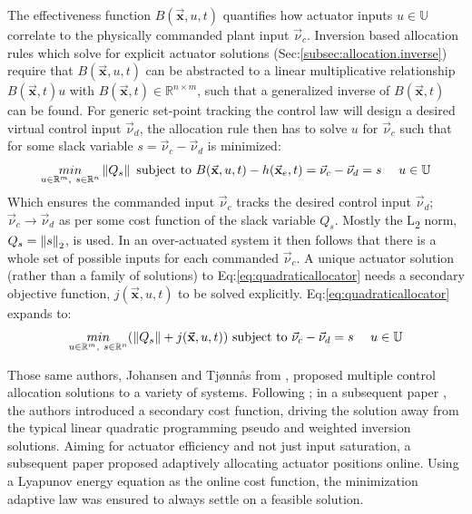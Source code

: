 \par
The effectiveness function $B(\vec{\mathbf{x}},u,t)$ quantifies how actuator inputs $u\in\mathbb{U}$ correlate to the physically commanded plant input $\vec{\nu}_c$. Inversion based allocation rules which solve for explicit actuator solutions (Sec:\ref{subsec:allocation.inverse}) require that $B(\vec{\mathbf{x}},u,t)$ can be abstracted to a linear multiplicative relationship $B(\vec{\mathbf{x}},t)u$ with $B(\vec{\mathbf{x}},t)\in\mathbb{R}^{n\times m}$, such that a generalized inverse of $B(\vec{\mathbf{x}},t)$ can be found. For generic set-point tracking the control law will design a desired virtual control input $\vec{\nu}_d$, the allocation rule then has to solve $u$ for $\vec{\nu}_c$ such that for some slack variable $s=\vec{\nu}_c-\vec{\nu}_d$ is minimized:
\begin{equation}\label{eq:quadraticallocator}
\underset{u \in \mathbb{R}^m,~s \in \mathbb{R}^n}{min}\left\lVert Q_s\right\rVert ~\text{subject to} ~B(\vec{\mathbf{x}},u,t) - h(\vec{\mathbf{x}}_e,t)=\vec{\nu}_c-\vec{\nu}_d=s~~~~u \in \mathbb{U}
\end{equation}
Which ensures the commanded input $\vec{\nu}_c$ tracks the desired control input $\vec{\nu}_d$;~$\vec{\nu}_c\rightarrow\vec{\nu}_d$ as per some cost function of the slack variable $Q_s$. Mostly the L\textsubscript{2} norm, $Q_s=\left\lVert s\right\rVert_2$, is used. In an over-actuated system it then follows that there is a whole set of possible inputs for each commanded $\vec{\nu}_c$. A unique actuator solution (rather than a family of solutions) to Eq:\ref{eq:quadraticallocator} needs a secondary objective function, $j(\vec{\mathbf{x}},u,t)$ to be solved explicitly. Eq:\ref{eq:quadraticallocator} expands to:
\begin{equation} \label{eq:quadraticallocatorcost}
\underset{u \in \mathbb{R}^m,~s \in \mathbb{R}^n}{min}(\left\lVert Q_s\right\rVert+j(\vec{\mathbf{x}},u,t)) ~\text{subject to} ~\vec{\nu}_c - \vec{\nu}_d=s~~~~u \in \mathbb{U}
\end{equation}
\par
Those same authors, Johansen and Tj{\o}nn\r{a}s from \cite{allocation,efficientallocation,adaptiveallocation}, proposed multiple control allocation solutions to a variety of systems. Following \cite{allocation}; in a subsequent paper \cite{efficientallocation}, the authors introduced a secondary cost function, driving the solution away from the typical linear quadratic programming pseudo and weighted inversion solutions.  Aiming for actuator efficiency and not just input saturation, a subsequent paper \cite{adaptiveallocation} proposed adaptively allocating actuator positions online. Using a Lyapunov energy equation as the online cost function, the minimization adaptive law was ensured to always settle on a feasible solution.
